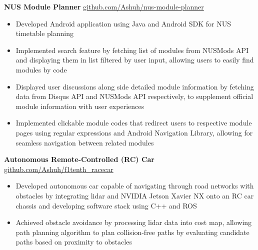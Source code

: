 \documentclass[11pt]{article}       %
\begin{document}
\textbf{NUS Module Planner} \hfill \href{https://github.com/Ashuh/nus-module-planner}{github.com/Ashuh/nus-module-planner} \\
\vspace{-9pt}
\begin{itemize}
  \item Developed Android application using Java and Android SDK for NUS timetable planning
  \item Implemented search feature by fetching list of modules from NUSMods API and displaying them in list filtered by user input, allowing users to easily find modules by code
  \item Displayed user discussions along side detailed module information by fetching data from Disqus API and NUSMods API respectively, to supplement official module information with user experiences
  \item Implemented clickable module codes that redirect users to respective module pages using regular expressions and Android Navigation Library, allowing for seamless navigation between related modules
\end{itemize}

\textbf{Autonomous Remote-Controlled (RC) Car} \hfill \href{https://github.com/Ashuh/f1tenth_racecar}{github.com/Ashuh/f1tenth\_racecar} \\
\vspace{-9pt}
\begin{itemize}
  \item Developed autonomous car capable of navigating through road networks with obstacles by integrating lidar and NVIDIA Jetson Xavier NX onto an RC car chassis and developing software stack using C++ and ROS
  \item Achieved obstacle avoidance by processing lidar data into cost map, allowing path planning algorithm to plan collision-free paths by evaluating candidate paths based on proximity to obstacles
\end{itemize}

\end{document}
